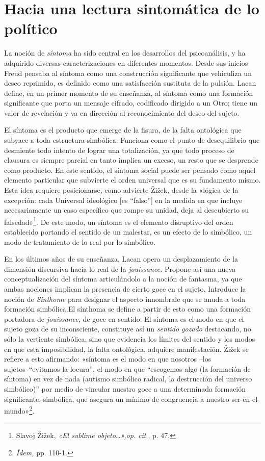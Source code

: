 \section{Hacia una lectura sintomática de lo político}

La noción de \emph{síntoma} ha sido central en los desarrollos del psicoanálisis, y ha adquirido diversas caracterizaciones en diferentes momentos. Desde sus inicios Freud pensaba al síntoma como una construcción significante que vehiculiza un deseo reprimido, es definido como una satisfacción sustituta de la pulsión. Lacan define, en un primer momento de su enseñanza, al síntoma como una formación significante que porta un mensaje cifrado, codificado dirigido a un Otro; tiene un valor de revelación y va en dirección al reconocimiento del deseo del sujeto.

El síntoma es el producto que emerge de la fisura, de la falta ontológica que subyace a toda estructura simbólica. Funciona como el punto de desequilibrio que desmiente todo intento de lograr una totalización, ya que todo proceso de clausura es siempre parcial en tanto implica un exceso, un resto que se desprende como producto. En este sentido, el síntoma social puede ser pensado como aquel elemento particular que subvierte el orden universal que es su fundamento mismo. Esta idea requiere posicionarse, como advierte Žižek, desde la «lógica de la excepción: cada Universal ideológico {[}es ``falso''{]} en la medida en que incluye necesariamente un caso específico que rompe su unidad, deja al descubierto su falsedad»\footnote{Slavoj Žižek, \emph{«El sublime objeto\ldots»,op. cit}., p. 47.}. De este modo, un síntoma es el elemento disruptivo del orden establecido portando el sentido de un malestar, es un efecto de lo simbólico, un modo de tratamiento de lo real por lo simbólico.

En los últimos años de su enseñanza, Lacan opera un desplazamiento de la dimensión discursiva hacia lo real de la \emph{jouissance.} Propone así una nueva conceptualización del síntoma articulándolo a la noción de fantasma, ya que ambas nociones implican la presencia de cierto goce en el sujeto. Introduce la noción de \emph{Sinthome} para designar el aspecto innombrale que se anuda a toda formación simbólica.El sínthoma se define a partir de esto como una formación portadora de \emph{jouissance,} de goce en sentido. El síntoma es el modo en que el sujeto goza de su inconsciente, constituye así un \emph{sentido gozado} destacando, no sólo la vertiente simbólica, sino que evidencia los límites del sentido y los modos en que esta imposibilidad, la falta ontológica, adquiere manifestación. Žižek se refiere a esto afirmando: «síntoma es el modo en que nosotros --los sujetos--``evitamos la locura'', el modo en que ``escogemos algo (la formación de síntoma) en vez de nada (autismo simbólico radical, la destrucción del universo simbólico)'' por medio de vincular nuestro goce a una determinada formación significante, simbólica, que asegura un mínimo de congruencia a nuestro ser-en-el-mundo»\footnote{\emph{Ídem,} pp. 110-1.}.

